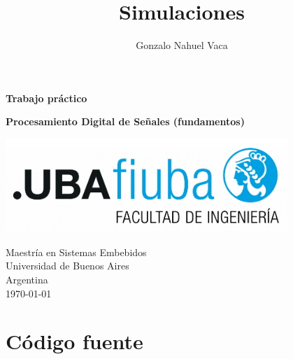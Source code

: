 \documentclass[
    11pt,
    spanish,
	a4paper
]{article}
\title{Simulaciones}
\author{Gonzalo Nahuel Vaca}
\def\doctype{Trabajo práctico}
\begin{document}
\makeatletter
\begin{titlepage}
	\begin{center}
		\vspace*{1cm}
		
		\Huge
		\textbf{\doctype}
		\vspace{0.5cm}
    
		\LARGE
		\@title
		\vspace{0.5cm}
    
		\textbf{Procesamiento Digital de Señales (fundamentos)}
		
		\vspace{1.5cm}
		
		\textbf{\@author}

		\vspace{1.5cm}

		\includegraphics[width=0.8\textwidth]{../img/logoFIUBA.pdf}
		
		\vfill
		Maestría en Sistemas Embebidos\\
		Universidad de Buenos Aires\\
		Argentina\\
		\today
	\end{center}
\end{titlepage}
\makeatother
\newpage

\section{Código fuente}
\end{document}
